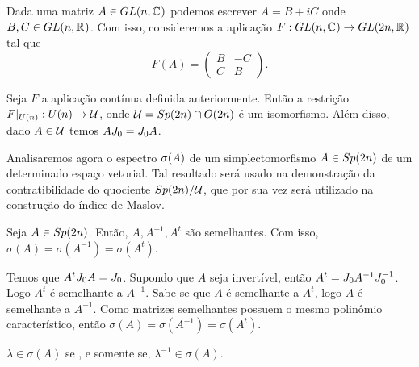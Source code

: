 \documentclass{beamer}
\begin{document}
\begin{frame}
	
	Dada uma matriz $A \in GL(n, \mathbb{C}^{})$ podemos escrever $A = B+iC$ onde $B,C \in GL(n, \mathbb{R}^{})$. Com isso, consideremos a aplicação $F:GL(n, \mathbb{C}^{}) \to GL(2n, \mathbb{R}^{})$ tal que 
	$$
	F(A)=
	\left(
	\begin{array}{cc}
	B & -C
	\\
	C & B
	\end{array}
	\right).
	$$
	
	
	\begin{lema}
		Seja $F$ a aplicação contínua definida anteriormente. Então a restrição $F|_{U(n)}: U(n) \to \mathcal{U} $, onde $\mathcal{U}  = Sp(2n)\cap O(2n)$ é um isomorfismo. Além disso, dado $A \in \mathcal{U} $ temos $AJ_{0}=J_{0} A$.
	\end{lema}
\end{frame}

\begin{frame}
		Analisaremos agora o espectro $\sigma(A)$ de um simplectomorfismo $A \in Sp(2n)$ de um determinado espaço vetorial. Tal resultado será usado na demonstração da contratibilidade do quociente $Sp(2n)/\mathcal{U}$, que por sua vez será utilizado na construção do índice de Maslov.
		
		\begin{lema}
			Seja $A \in Sp(2n)$. Então, $A, A^{-1}, A^{t}$ são semelhantes. Com isso, $\sigma(A) = \sigma(A^{-1}) = \sigma(A^{t}) $.
		\end{lema}
		\begin{prova}
			Temos que $A^{t}J_{0} A = J_{0}$. Supondo que $A$ seja invertível, então $A^{t} = J_{0} A^{-1} J_{0}^{-1}$. Logo $A^{t}$ é semelhante a $A^{-1}$. Sabe-se que $A$ é semelhante a $A^{t}$, logo $A$ é semelhante a $A^{-1}$. Como matrizes semelhantes possuem o mesmo polinômio característico, então $\sigma(A) = \sigma(A^{-1}) = \sigma(A^{t}) $.
		\end{prova}
		
		\begin{observacao}
			$\lambda \in \sigma(A)$ se , e somente se, $\lambda^{-1}\in \sigma(A)$.
		\end{observacao}
		
\end{frame}
\end{document}
